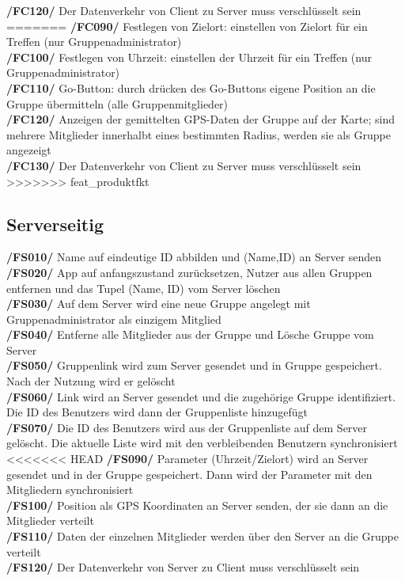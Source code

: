      \textbf{/FC120/} Der Datenverkehr von Client zu Server muss verschlüsselt sein\\
=======
     \textbf{/FC090/} Festlegen von Zielort: einstellen von Zielort für ein Treffen (nur Gruppenadministrator)\\
     \textbf{/FC100/} Festlegen von Uhrzeit: einstellen der Uhrzeit für ein Treffen (nur Gruppenadministrator) \\
     \textbf{/FC110/} Go-Button: durch drücken des Go-Buttons eigene Position an die Gruppe übermitteln (alle Gruppenmitglieder)\\
     \textbf{/FC120/} Anzeigen der gemittelten GPS-Daten der Gruppe auf der Karte; sind mehrere Mitglieder innerhalbt eines bestimmten Radius,
     werden sie als Gruppe angezeigt\\
     \textbf{/FC130/} Der Datenverkehr von Client zu Server muss verschlüsselt sein\\
>>>>>>> feat_produktfkt
\subsection{Serverseitig}
     \textbf{/FS010/} Name auf eindeutige ID abbilden und (Name,ID) an Server senden\\
     \textbf{/FS020/} App auf anfangszustand zurücksetzen, Nutzer aus allen Gruppen entfernen und das Tupel (Name, ID) vom Server löschen \\
     \textbf{/FS030/} Auf dem Server wird eine neue Gruppe angelegt mit Gruppenadministrator als einzigem Mitglied\\
     \textbf{/FS040/} Entferne alle Mitglieder aus der Gruppe und Lösche Gruppe vom Server\\
     \textbf{/FS050/} Gruppenlink wird zum Server gesendet und in Gruppe gespeichert. Nach der Nutzung wird er gelöscht\\
     \textbf{/FS060/} Link wird an Server gesendet und die zugehörige Gruppe identifiziert.\\ Die ID des Benutzers wird dann der Gruppenliste hinzugefügt\\
     \textbf{/FS070/} Die ID des Benutzers wird aus der Gruppenliste auf dem Server gelöscht. Die aktuelle Liste wird mit den verbleibenden Benutzern synchronisiert\\
<<<<<<< HEAD
     \textbf{/FS090/} Parameter (Uhrzeit/Zielort) wird an Server gesendet und in der Gruppe gespeichert. Dann wird der Parameter mit den Mitgliedern synchronisiert \\
     \textbf{/FS100/} Position als GPS Koordinaten an Server senden, der sie dann an die Mitglieder verteilt\\
     \textbf{/FS110/} Daten der einzelnen Mitglieder werden über den Server an die Gruppe verteilt \\
     \textbf{/FS120/} Der Datenverkehr von Server zu Client muss verschlüsselt sein\\

